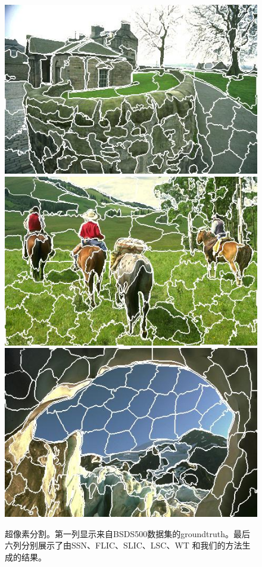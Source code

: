 \begin{figure}[h]
{\begin{minipage}[b]{0.13\linewidth}
\includegraphics[width=1\linewidth]{figures/img/ours_sp/ourssp_92014.jpg}
\includegraphics[width=1\linewidth]{figures/img/ours_sp/ourssp_220003.jpg}
\includegraphics[width=1\linewidth]{figures/img/ours_sp/ourssp_176051.jpg}
\end{minipage}}
\caption{超像素分割。第一列显示来自BSDS500数据集的groundtruth。最后六列分别展示了由SSN、FLIC、SLIC、LSC、WT 和我们的方法生成的结果。}
\label{fig5.2}
\end{figure}

